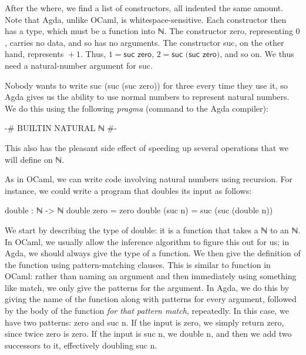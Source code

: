 \documentclass{lecturenotes}
\newcommand{\agdanats}{\textsf{ℕ}\xspace}
\begin{document}
After the \textsf{where}, we find a list of constructors, all indented the same amount.
Note that Agda, unlike OCaml, is whitespace-sensitive.
Each constructor then has a type, which must be a function into \agdanats.
The constructor \textsf{zero}, representing $0$, carries no data, and so has no arguments.
The constructor \textsf{suc}, on the other hand, represents ${} + 1$.
Thus, $1 = \textsf{suc zero}$, $2 = \textsf{suc (suc zero)}$, and so on.
We thus need a natural-number argument for \textsf{suc}.

Nobody wants to write \textsf{suc (suc (suc zero))} for three every time they use it, so Agda gives us the ability to use normal numbers to represent natural numbers.
We do this using the following \emph{pragma} (command to the Agda compiler):
\begin{center}
\begin{code}
  {-# BUILTIN NATURAL ℕ #-}
\end{code}
\end{center}
This also has the pleasant side effect of speeding up several operations that we will define on \agdanats.

\pagebreak
As in OCaml, we can write code involving natural numbers using recursion.
For instance, we could write a program that \textsf{double}s its input as follows:
\begin{center}
\begin{code}
  double : ℕ -> ℕ
  double zero = zero
  double (suc n) = suc (suc (double n))
\end{code}
\end{center}
We start by describing the type of \textsf{double}: it is a function that takes a \agdanats to an \agdanats.
In OCaml, we usually allow the inference algorithm to figure this out for us; in Agda, we should always give the type of a function.
We then give the definition of the function using pattern-matching clauses.
This is similar to \textsf{function} in OCaml: rather than naming an argument and then immediately using something like \textsf{match}, we only give the patterns for the argument.
In Agda, we do this by giving the name of the function along with patterns for every argument, followed by the body of the function \emph{for that pattern match}, repeatedly.
In this case, we have two patterns: \textsf{zero} and \textsf{suc n}.
If the input is \textsf{zero}, we simply return \textsf{zero}, since twice zero is zero.
If the input is \textsf{suc n}, we double \textsf{n}, and then we add two successors to it, effectively doubling \textsf{suc n}.
\end{document}
